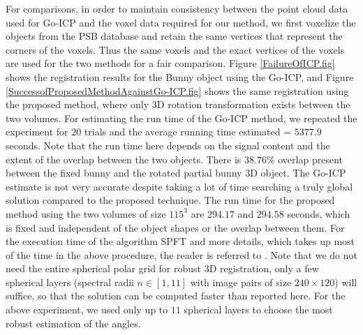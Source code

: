 \documentclass{UCF_ETD}
\begin{document}
For comparisons, in order to maintain consistency between the point cloud data used for Go-ICP and the voxel data required for our method, we first voxelize the objects from the PSB database and retain the same vertices that represent the corners of the voxels. Thus the same voxels and the exact vertices of the voxels are used for the two methods for a fair comparison. Figure \ref{FailureOfICP.fig} shows the registration results for the Bunny object using the Go-ICP, and Figure \ref{SuccessofProposedMethodAgainstGo-ICP.fig} shows the same registration using the proposed method, where only $3$D rotation transformation exists between the two volumes. For estimating the run time of the Go-ICP method, we repeated the experiment for $20$ trials and the average running time estimated = $5377.9$ seconds. Note that the run time here depends on the signal content and the extent of the overlap between the two objects. There is $38.76\%$ overlap present between the fixed bunny and the rotated partial bunny $3$D object. The Go-ICP estimate is not very accurate despite taking a lot of time searching a truly global solution compared to the proposed technique. The run time for the proposed method using the two volumes of size $115^3$ are $294.17$ and $294.58$ seconds, which is fixed and independent of the object shapes or the overlap between them.  For the execution time of the algorithm SPFT and more details, which takes up most of the time in the above procedure, the reader is referred to \cite{Alam2015}. Note that we do not need the entire spherical polar grid for robust $3$D registration, only a few spherical layers (spectral radii $n \in [1,11]$ with image pairs of size $240 \times 120$) will suffice, so that the solution can be computed faster than reported here. For the above experiment, we used only up to $11$ spherical layers to choose the most robust estimation of the angles. 
\end{document}
